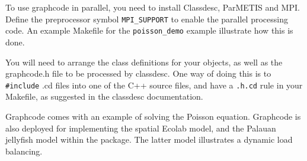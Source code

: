 To use graphcode in parallel, you need to install
Classdesc, ParMETIS and
MPI. Define the preprocessor symbol
\verb+MPI_SUPPORT+ to enable the parallel
processing code. An example Makefile for the \verb+poisson_demo+
example illustrate how this is done.

You will need to arrange the class definitions for your objects, as
well as the graphcode.h file to be processed by 
classdesc. One way of doing this is to \verb+#include+ .cd files into one of
the C++ source files, and have a \verb+.h.cd+ rule in your Makefile, as
suggested in the classdesc documentation.



Graphcode comes with an example of solving the Poisson
equation. Graphcode is also deployed for implementing the spatial
Ecolab model, and the Palauan jellyfish model within the \EcoLab{}
package. The latter model illustrates a dynamic load balancing.

\printindex


